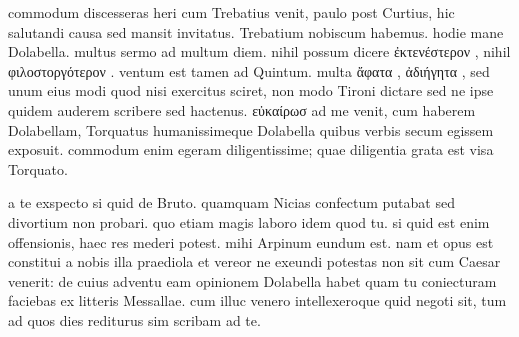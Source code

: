 


 commodum discesseras heri cum Trebatius venit, paulo post Curtius, hic salutandi causa sed mansit invitatus. Trebatium nobiscum habemus. hodie mane Dolabella. multus sermo ad multum diem. nihil possum dicere ἐκτενέστερον , nihil φιλοστοργότερον . ventum est tamen ad Quintum. multa ἄφατα , ἀδιήγητα , sed unum eius modi quod nisi exercitus sciret, non modo Tironi dictare sed ne ipse quidem auderem scribere sed hactenus. εὐκαίρωσ ad me venit, cum haberem Dolabellam, Torquatus humanissimeque Dolabella quibus verbis secum egissem exposuit. commodum enim egeram diligentissime; quae diligentia grata est visa Torquato.

 a te exspecto si quid de Bruto. quamquam Nicias confectum putabat sed divortium non probari. quo etiam magis laboro idem quod tu. si quid est enim offensionis, haec res mederi potest. mihi Arpinum eundum est. nam et opus est constitui a nobis illa praediola et vereor ne exeundi potestas non sit cum Caesar venerit: de cuius adventu eam opinionem Dolabella habet quam tu coniecturam faciebas ex litteris Messallae. cum illuc venero intellexeroque quid negoti sit, tum ad quos dies rediturus sim scribam ad te.
